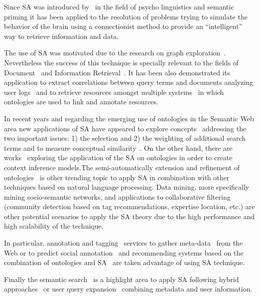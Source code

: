 Since SA was introduced by~\cite{Collins_Loftus_1975} in the field of 
psycho linguistics and semantic priming it has been applied to the resolution
of problems trying to simulate the behavior of the brain using a connectionist method
to provide an ``intelligent'' way to retrieve information and data. 

The use of SA was motivated due to the research on graph exploration~\cite{Scott1981,AndersonTheory,Cohen1987}. Nevertheless
the success of this technique is specially relevant to the fields of Document~\cite{turtle91inference} 
and Information Retrieval~\cite{SpreadingActivationIR,Helmut2004,Agosti1993,Grinberg:2011:ASA:1940632.1940674}. It has
been also demonstrated its application to extract correlations between query terms and documents analyzing user 
logs~\cite{Cui03} and to retrieve resources amongst multiple systems~\cite{Schumacher+2008search} 
in which ontologies are used to link and annotate resources.

In recent years and regarding the emerging use of ontologies in the Semantic Web area new applications of SA have
appeared to explore concepts~\cite{Qiu93,Chen95} addressing the two important issues: 1) the selection and 2) the weighting of
additional search terms and to measure conceptual similarity~\cite{gouws-vanrooyen-engelbrecht:2010:CCSR}. 
On the other hand, there are works~\cite{DBLP:journals/cogsr/KatiforiVD10,DBLP:journals/ijsc/DixKLVS10} 
exploring the application of the SA on ontologies in order to create context inference models.The 
semi-automatically extension and refinement of ontologies~\cite{liu_et_al_2005} is other trending topic to apply SA
in combination with other techniques based on natural language processing. Data mining,
more specifically mining socio-semantic networks\cite{paper:troussov:2008}, and applications 
to collaborative filtering (community detection based on tag recommendations, expertise location, etc.) are other 
potential scenarios to apply the SA theory due to the high performance and high scalability of the technique.

In particular, annotation and tagging~\cite{labraTagging2007,LabraWesoNet} services to gather 
meta-data~\cite{GelgiVD05} from the Web or to predict social annotation~\cite{Chen:2007:PSA:1780653.1780702} and recommending 
systems based on the combination of ontologies and SA~\cite{citeulike:3779904} are taken advantage of using SA technique. 

Finally the semantic search~\cite{conf-sofsem-Suchal08,Wolverton94retrievingsemantically}  is a highlight area to apply SA following
hybrid approaches~\cite{bopaEstonia,RochaSA04} or user query expansion~\cite{767402} combining metadata 
and user information.

